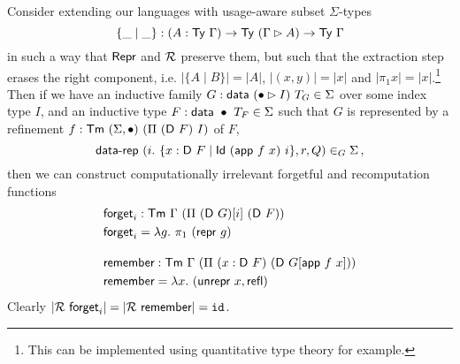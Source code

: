 Consider extending our languages with usage-aware
subset $\Sigma$-types
\[
\{ \_ \mid \_ \} : (A : \textsf{Ty}\ \Gamma) \to \textsf{Ty}\ (\Gamma \rhd A) \to \textsf{Ty}\ \Gamma
\]
in such a way that $\textsf{Repr}$ and $\mathcal{R}$ preserve them, but such that the extraction
step erases the right component, i.e. $|\{A \mid B\}| = |A|$, $|(x, y)| = |x|$ and $|\pi_1 x| =
|x|$.\footnote{This can be implemented using quantitative type theory for example.}
Then if we have an inductive family $G : \textsf{data}\ (\bullet \rhd I)\ T_G
\in \Sigma$ over some index type $I$, and an inductive type $F : \mta{data}\ \bullet\
T_F \in \Sigma$ such that $G$ is represented by a refinement $f : \textsf{Tm}\
(\Sigma,\bullet)\ (\Pi\ (\textsf{D}\ F)\ I)$ of $F$,
\[
    \textsf{data-rep}\ (i.\ \{ x : \textsf{D}\ F \mid \textsf{Id}\ (\textsf{app}\ f\ x)\ i \}, r, Q) \in_G \Sigma \,,
\]
then we can construct computationally irrelevant forgetful and recomputation functions
\begin{align*}
&\mta{forget}_i : \Tm\ \Gamma\ (\Pi\ (\mta{D}\ G)[i]\ (\mta{D}\ F)) \\
&\mta{forget}_i = \lambda g.\ \pi_1\ (\mta{repr}\ g) \\[1em]
&\mta{remember} : \Tm\ \Gamma\ (\Pi\ (x : \mta{D}\ F)\ (\mta{D}\ G[\mta{app}\ f\ x])) \\
&\mta{remember} = \lambda x.\ (\mta{unrepr}\ x, \mta{refl})
\end{align*}
Clearly $|\R\ \mta{forget}_i| = |\R\ \mta{remember}| = \texttt{id}$.
